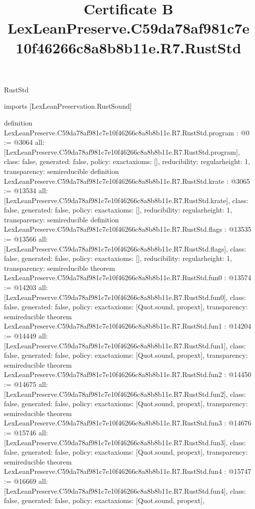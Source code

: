 \begin{lexlean}{RustStd}
\title{Certificate B LexLeanPreserve.C59da78af981c7e10f46266c8a8b8b11e.R7.RustStd}
\begin{coremodule}
imports [LexLeanPreservation.RustSound]

definition LexLeanPreserve.C59da78af981c7e10f46266c8a8b8b11e.R7.RustStd.program : @0 := @3064 {
  all: [LexLeanPreserve.C59da78af981c7e10f46266c8a8b8b11e.R7.RustStd.program],
  class: false,
  generated: false,
  policy: exact{axioms: []},
  reducibility: regular{height: 1},
  transparency: semireducible
}
definition LexLeanPreserve.C59da78af981c7e10f46266c8a8b8b11e.R7.RustStd.krate : @3065 := @13534 {
  all: [LexLeanPreserve.C59da78af981c7e10f46266c8a8b8b11e.R7.RustStd.krate],
  class: false,
  generated: false,
  policy: exact{axioms: []},
  reducibility: regular{height: 1},
  transparency: semireducible
}
definition LexLeanPreserve.C59da78af981c7e10f46266c8a8b8b11e.R7.RustStd.flags : @13535 := @13566 {
  all: [LexLeanPreserve.C59da78af981c7e10f46266c8a8b8b11e.R7.RustStd.flags],
  class: false,
  generated: false,
  policy: exact{axioms: []},
  reducibility: regular{height: 1},
  transparency: semireducible
}
theorem LexLeanPreserve.C59da78af981c7e10f46266c8a8b8b11e.R7.RustStd.fun0 : @13574 := @14203 {
  all: [LexLeanPreserve.C59da78af981c7e10f46266c8a8b8b11e.R7.RustStd.fun0],
  class: false,
  generated: false,
  policy: exact{axioms: [Quot.sound, propext]},
  transparency: semireducible
}
theorem LexLeanPreserve.C59da78af981c7e10f46266c8a8b8b11e.R7.RustStd.fun1 : @14204 := @14449 {
  all: [LexLeanPreserve.C59da78af981c7e10f46266c8a8b8b11e.R7.RustStd.fun1],
  class: false,
  generated: false,
  policy: exact{axioms: [Quot.sound, propext]},
  transparency: semireducible
}
theorem LexLeanPreserve.C59da78af981c7e10f46266c8a8b8b11e.R7.RustStd.fun2 : @14450 := @14675 {
  all: [LexLeanPreserve.C59da78af981c7e10f46266c8a8b8b11e.R7.RustStd.fun2],
  class: false,
  generated: false,
  policy: exact{axioms: [Quot.sound, propext]},
  transparency: semireducible
}
theorem LexLeanPreserve.C59da78af981c7e10f46266c8a8b8b11e.R7.RustStd.fun3 : @14676 := @15746 {
  all: [LexLeanPreserve.C59da78af981c7e10f46266c8a8b8b11e.R7.RustStd.fun3],
  class: false,
  generated: false,
  policy: exact{axioms: [Quot.sound, propext]},
  transparency: semireducible
}
theorem LexLeanPreserve.C59da78af981c7e10f46266c8a8b8b11e.R7.RustStd.fun4 : @15747 := @16669 {
  all: [LexLeanPreserve.C59da78af981c7e10f46266c8a8b8b11e.R7.RustStd.fun4],
  class: false,
  generated: false,
  policy: exact{axioms: [Quot.sound, propext]},
}
\end{coremodule}
\end{lexlean}

